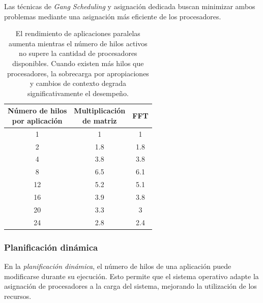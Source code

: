 Las técnicas de \textit{Gang Scheduling} y asignación dedicada buscan minimizar ambos problemas mediante una asignación más eficiente de los procesadores.

\begin{table}[!ht]
  \centering
  \begin{tabular}{c|c|c}
    \makecell{Número de hilos \\ por aplicación} & 
    \makecell{Multiplicación \\ de matriz} & 
    FFT \\ 
    \hline 
    1 & 1 & 1 \\ 
    2 & 1.8 & 1.8 \\
    4 & 3.8 & 3.8 \\
    8 & 6.5 & 6.1 \\
    12 & 5.2 & 5.1 \\
    16 & 3.9 & 3.8 \\
    20 & 3.3 & 3 \\
    24 & 2.8 & 2.4 \\
  \end{tabular}
  \caption{El rendimiento de aplicaciones paralelas aumenta mientras el número de hilos activos no supere la cantidad de procesadores disponibles. Cuando existen más hilos que procesadores, la sobrecarga por apropiaciones y cambios de contexto degrada significativamente el desempeño.}
\end{table}

\subsubsection{Planificación dinámica}

En la \textit{planificación dinámica}, el número de hilos de una aplicación puede modificarse durante su ejecución. Esto permite que el sistema operativo adapte la asignación de procesadores a la carga del sistema, mejorando la utilización de los recursos.


